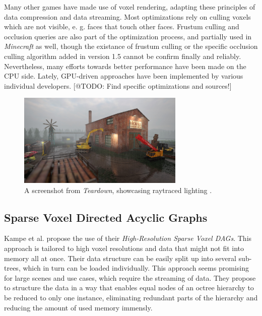 \noindent
Many other games have made use of voxel rendering, adapting these principles of data compression and data streaming. 
Most optimizations rely on culling voxels which are not visible, e. g. faces that touch other faces.
Frustum culling and occlusion queries are also part of the optimization process, and partially used in \emph{Minecraft} 
as well, though the existance of frustum culling or the specific occlusion culling algorithm added in version 1.5 
cannot be confirm finally and reliably. Nevertheless, many efforts towards better performance have been made on the 
\ac{CPU} side. Lately, \ac{GPU}-driven approaches have been implemented by various individual developers. 
[@TODO: Find specific optimizations and sources!]  \\

\begin{figure}[h]
    \centering
    \includegraphics[width=300px]{images/graphics/teardown-ray-tracing.jpg}
    \caption{A screenshot from \emph{Teardown}, showcasing raytraced lighting \cite{TeardownSteam2022}.}
    \label{fig:teardown-raytracing}
\end{figure}

\subsection*{Sparse Voxel Directed Acyclic Graphs}

Kampe et al. \cite{Kampe2013} propose the use of their \emph{High-Resolution Sparse Voxel \ac{DAG}s}. This approach 
is tailored to high voxel resolutions and data that might not fit into memory all at once. Their data structure can 
be easily split up into several sub-trees, which in turn can be loaded individually. This approach seems promising 
for large scenes and use cases, which require the streaming of data. They propose to structure the data in a way that 
enables equal nodes of an octree hierarchy to be reduced to only one instance, eliminating redundant parts of the 
hierarchy and reducing the amount of used memory immensly. \\

